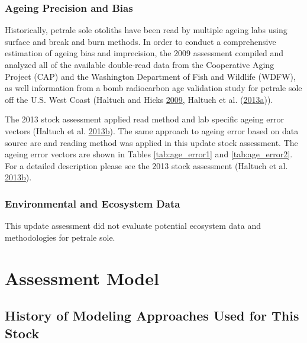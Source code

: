 \documentclass[12pt,]{article}
\begin{document}
\subsubsection{Ageing Precision and
Bias}\label{ageing-precision-and-bias}

Historically, petrale sole otoliths have been read by multiple ageing
labs using surface and break and burn methods. In order to conduct a
comprehensive estimation of ageing bias and imprecision, the 2009
assessment compiled and analyzed all of the available double-read data
from the Cooperative Aging Project (CAP) and the Washington Department
of Fish and Wildlife (WDFW), as well information from a bomb radiocarbon
age validation study for petrale sole off the U.S. West Coast (Haltuch
and Hicks \protect\hyperlink{ref-haltuch_status_2009}{2009}, Haltuch et
al.
(\protect\hyperlink{ref-haltuch_california_2013}{2013}\protect\hyperlink{ref-haltuch_california_2013}{a})).

The 2013 stock assessment applied read method and lab specific ageing
error vectors (Haltuch et al.
\protect\hyperlink{ref-haltuch_status_2013}{2013}\protect\hyperlink{ref-haltuch_status_2013}{b}).
The same approach to ageing error based on data source are and reading
method was applied in this update stock assessment. The ageing error
vectors are shown in Tables \ref{tab:age_error1} and
\ref{tab:age_error2}. For a detailed description please see the 2013
stock assessment (Haltuch et al.
\protect\hyperlink{ref-haltuch_status_2013}{2013}\protect\hyperlink{ref-haltuch_status_2013}{b}).

\subsubsection{Environmental and Ecosystem
Data}\label{environmental-and-ecosystem-data}

This update assessment did not evaluate potential ecosystem data and
methodologies for petrale sole.

\section{Assessment Model}\label{assessment-model}

\subsection{History of Modeling Approaches Used for This
Stock}\label{history-of-modeling-approaches-used-for-this-stock}
\end{document}
